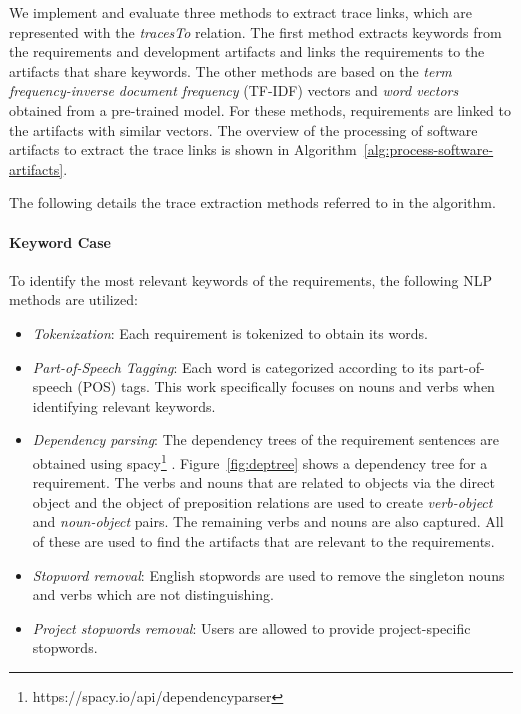       We implement and evaluate three methods to extract trace links, which are represented with the \emph{tracesTo} relation. 
 The first method extracts keywords from the requirements and development artifacts and links the requirements to the artifacts that share keywords. 
 The other methods are based on the \textit{term frequency-inverse document frequency} (TF-IDF) vectors and \textit{word vectors} obtained from a pre-trained model.
For these methods, requirements are linked to the artifacts with similar vectors. 
      The overview of the processing of software artifacts to extract the trace links is shown in Algorithm~\ref{alg:process-software-artifacts}.
            
 The following details the trace extraction methods referred to in the algorithm. 

      \paragraph{Keyword Case} To identify the most relevant keywords of the requirements, the following NLP methods are utilized:  
      \begin{itemize}
      \item \textit{Tokenization}: Each requirement is tokenized to obtain its words.
      \item  \textit{Part-of-Speech Tagging}: Each word is categorized according to its part-of-speech (POS) tags. 
      This work specifically focuses on nouns and verbs when identifying relevant keywords. 

      \item  \textit{Dependency parsing}: The dependency trees of the requirement sentences are obtained using spacy\footnote{https://spacy.io/api/dependencyparser} .
      Figure~\ref{fig:deptree} shows a dependency tree for a requirement.
      The verbs and nouns that are related to objects via the direct object and the object of preposition relations are used to create \emph{verb-object} and \emph{noun-object} pairs.
      The remaining verbs and nouns are also captured.
      All of these are used to find the artifacts that are relevant to the requirements.

      \item  \textit{Stopword removal}: English stopwords are used to remove the singleton nouns and verbs which are not distinguishing.

      \item  \textit{Project stopwords removal}: Users are allowed to provide project-specific stopwords. 
      \end{itemize}

